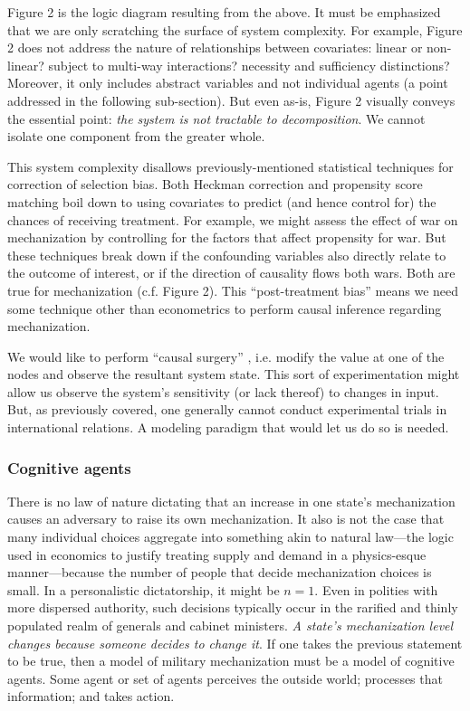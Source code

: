 \documentclass{article}
\begin{document}
Figure 2 is the logic diagram resulting from the above. It must be emphasized that we are only scratching the 
surface of system complexity. For example, Figure 2 does not address the nature of relationships 
between covariates: linear or non-linear? subject to multi-way
interactions? necessity and sufficiency distinctions? Moreover, it only includes 
abstract variables and not individual agents (a point addressed in the following
sub-section). But even as-is, Figure 2 visually conveys the essential point: \textit{the system is
not tractable to decomposition}. We cannot isolate one component from the
greater whole.  

This system complexity disallows previously-mentioned statistical techniques
for correction of selection bias. Both Heckman correction and propensity score
matching boil down to using covariates to predict (and hence control for) the chances 
of receiving treatment. For example, we might assess the effect of war on
mechanization by controlling for the factors that affect propensity for war. 
But these techniques break down if the confounding variables also directly
relate to the outcome of interest, or if the direction of causality flows both
wars. Both are true for mechanization 
(c.f. Figure 2). This ``post-treatment bias'' \citep{king2010hard} means we need
some technique other than econometrics to perform causal inference regarding
mechanization.

We would like to perform ``causal surgery'' \citep{pearl2009causality}, i.e. modify the value at one
of the nodes and observe the resultant system state. This sort of
experimentation might allow us observe the system's sensitivity (or lack thereof) to changes
in input. But, as previously covered, one generally cannot conduct
experimental trials in international relations.  A modeling paradigm that would let us do so is needed.

\subsubsection{Cognitive agents}

There is no law of nature dictating that an increase in one state's mechanization causes an adversary to 
raise its own mechanization. It also is not the case that many individual choices aggregate into something 
akin to natural law---the logic used 
in economics to justify treating supply and demand in a physics-esque manner---because the number of
people that decide mechanization choices is small. In a personalistic
dictatorship, it might be $n=1$. Even in polities with more dispersed authority, such decisions
typically occur in the rarified and thinly populated realm of generals and cabinet ministers. 
\textit{A state's mechanization level changes because someone decides to change it}. If one takes 
the previous statement to be true, then a model of military mechanization must be a model of 
cognitive agents.  Some agent or set of agents perceives the outside
world; processes that information; and takes action. 
\end{document}
